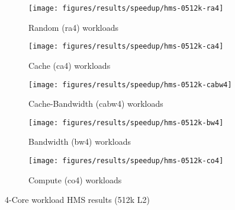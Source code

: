 \begin{figure}
    \centering
    \begin{subfigure}[b]{\textwidth}
            \texttt{[image: figures/results/speedup/hms-0512k-ra4]}
            \caption{Random (ra4) workloads}
            \label{fig:results:4core:hms:random}
    \end{subfigure}

    \begin{subfigure}[b]{0.5\textwidth}
            \texttt{[image: figures/results/speedup/hms-0512k-ca4]}
            \caption{Cache (ca4) workloads}
            \label{fig:results:4core:hms:cache}
    \end{subfigure}%
    \begin{subfigure}[b]{0.5\textwidth}
            \texttt{[image: figures/results/speedup/hms-0512k-cabw4]}
            \caption{Cache-Bandwidth (cabw4) workloads}
            \label{fig:results:4core:hms:cache-bw}
    \end{subfigure}

    \begin{subfigure}[b]{0.5\textwidth}
            \texttt{[image: figures/results/speedup/hms-0512k-bw4]}
            \caption{Bandwidth (bw4) workloads}
            \label{fig:results:4core:hms:bw}
    \end{subfigure}%
    \begin{subfigure}[b]{0.5\textwidth}
            \texttt{[image: figures/results/speedup/hms-0512k-co4]}
            \caption{Compute (co4) workloads}
            \label{fig:results:4core:hms:co}
    \end{subfigure}%

    \caption{4-Core workload HMS results (512k L2)}\label{fig:results:4core:hms}
\end{figure}

